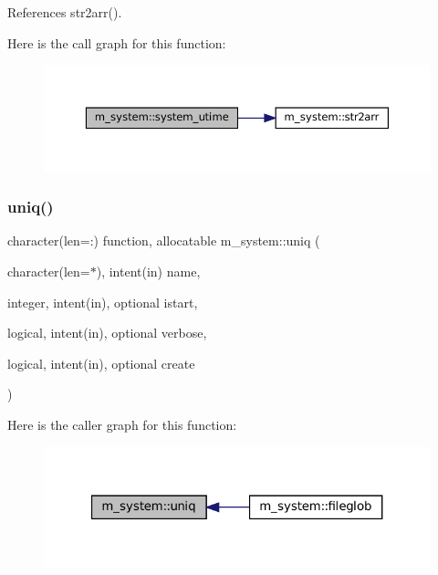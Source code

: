 References str2arr().

Here is the call graph for this function\+:
\nopagebreak
\begin{figure}[H]
\begin{center}
\leavevmode
\includegraphics[width=350pt]{namespacem__system_a83a121ba0b525210b5217565569ef350_cgraph}
\end{center}
\end{figure}
\mbox{\label{namespacem__system_a403bef1f7fdc42dd75a5b082a15237ff}} 
\subsubsection{\texorpdfstring{uniq()}{uniq()}}
{\footnotesize\ttfamily character(len=\+:) function, allocatable m\+\_\+system\+::uniq (\begin{DoxyParamCaption}\item[{character(len=$\ast$), intent(in)}]{name,  }\item[{integer, intent(in), optional}]{istart,  }\item[{logical, intent(in), optional}]{verbose,  }\item[{logical, intent(in), optional}]{create }\end{DoxyParamCaption})\hspace{0.3cm}{\ttfamily [private]}}

Here is the caller graph for this function\+:
\nopagebreak
\begin{figure}[H]
\begin{center}
\leavevmode
\includegraphics[width=321pt]{namespacem__system_a403bef1f7fdc42dd75a5b082a15237ff_icgraph}
\end{center}
\end{figure}


